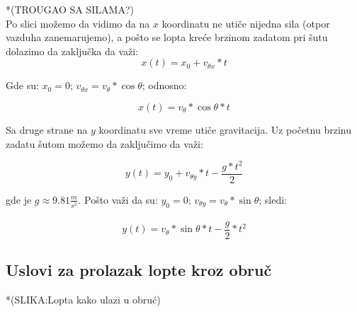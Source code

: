 \documentclass[a4paper, 12pt]{article}
\begin{document}
*(TROUGAO SA SILAMA?)\\


Po slici možemo da vidimo da na $x$ koordinatu ne utiče nijedna sila (otpor vazduha zanemarujemo), a pošto se lopta kreće brzinom zadatom pri šutu dolazimo da zaključka da važi:\\

\[x(t) = x_0 + v_{\theta x}*t\]

Gde su: $x_0 = 0$; $v_{\theta x} = v_\theta * \cos \theta$; odnosno:

\[x(t) = v_\theta * \cos \theta*t\]

Sa druge strane na $y$ koordinatu sve vreme utiče gravitacija. Uz početnu brzinu zadatu šutom možemo da zaključimo da važi:

\[y(t) = y_0 + v_{\theta y}*t - \dfrac{g*t^2}{2}\]

gde je $g \approx 9.81\dfrac{_m}{^{s^2}}$. Pošto važi da su: $y_0 = 0$; $v_{\theta y} = v_\theta * \sin \theta$; sledi:

\[y(t) = v_{\theta}* \sin \theta*t - \dfrac{g}{2}*t^2\]

\subsection{Uslovi za prolazak lopte kroz obruč}

*(SLIKA:Lopta kako ulazi u obruć)\\
\end{document}
